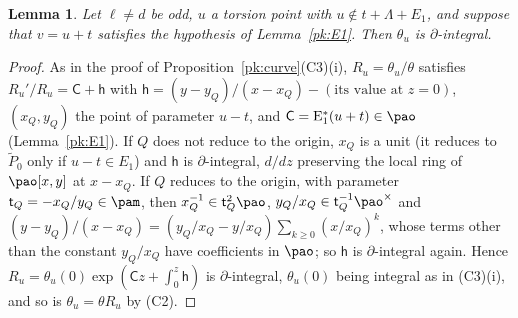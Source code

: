 \documentclass[10pt]{amsart}
\newtheorem{lemma}[theorem]{Lemma}
\theoremstyle{definition}
\theoremstyle{remark}
\begin{document}
\begin{lemma}\label{pk:formal}
Let $\ell\ne d$ be odd, $u$ a torsion point with $u\notin t+\Lambda+E_1$, and suppose that
$v=u+t$ satisfies the hypothesis of Lemma~\ref{pk:E1}. Then $\theta_u$ is $\partial$-integral.
\end{lemma}
\begin{proof}
As in the proof of Proposition~\ref{pk:curve}(C3)(i), $R_u=\theta_u/\theta$ satisfies
$R_u'/R_u=\mathsf C+\mathsf h$ with $\mathsf h=(y-y_Q)/(x-x_Q)-(\text{its value at }z=0)$,
$(x_Q,y_Q)$ the point of parameter $u-t$, and $\mathsf C=\mathrm E_1^*(u+t)\in\pao$
(Lemma~\ref{pk:E1}). If $Q$ does not reduce to the origin, $x_Q$ is a unit (it reduces to $\tilde
P_0$ only if $u-t\in E_1$) and $\mathsf h$ is $\partial$-integral, $d/dz$ preserving the local
ring of $\pao[x,y]$ at $x-x_Q$. If $Q$ reduces to the origin, with parameter $\mathsf t_Q=-x_Q/y_Q
\in\pam$, then $x_Q^{-1}\in\mathsf t_Q^2\pao$, $y_Q/x_Q\in\mathsf t_Q^{-1}\pao^\times$ and
$(y-y_Q)/(x-x_Q)=(y_Q/x_Q-y/x_Q)\sum_{k\ge0}(x/x_Q)^k$, whose terms other than the constant
$y_Q/x_Q$ have coefficients in $\pao$; so $\mathsf h$ is $\partial$-integral again. Hence
$R_u=\theta_u(0)\exp(\mathsf Cz+\int_0^z\mathsf h)$ is $\partial$-integral, $\theta_u(0)$ being
integral as in (C3)(i), and so is $\theta_u=\theta R_u$ by (C2).
\end{proof}
\end{document}
